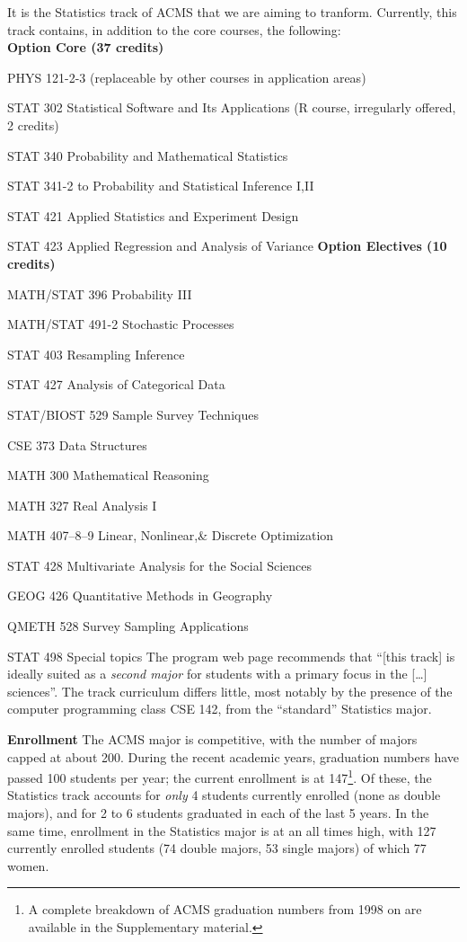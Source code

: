 It is the Statistics track of ACMS that we are aiming to
tranform. Currently, this track contains, in addition to the core
courses, the following:
\\
{\bf Option Core (37 credits)}
\bits
    \item {\sc PHYS 121-2-3} (replaceable by other courses in application areas)
    \item {\sc STAT 302} Statistical Software and Its Applications (R course, irregularly offered, 2 credits)
    \item {\sc STAT 340} Probability and Mathematical Statistics
    \item {\sc STAT 341-2} to Probability and Statistical Inference I,II
    \item {\sc STAT 421} Applied Statistics and Experiment Design
    \item {\sc STAT 423} Applied Regression and Analysis of Variance
\eits
{\bf Option Electives (10 credits)}
\bits
    \item {\sc MATH/STAT 396} Probability III
    \item {\sc MATH/STAT 491-2} Stochastic Processes
    \item {\sc STAT 403}  Resampling Inference
    \item {\sc STAT 427}  Analysis of Categorical Data
    \item {\sc STAT/BIOST 529} Sample Survey Techniques
    \item {\sc CSE 373} Data Structures
    \item {\sc MATH 300} Mathematical Reasoning
    \item {\sc MATH 327}  Real Analysis I
    \item {\sc MATH 407--8--9} Linear, Nonlinear,\& Discrete Optimization
    \item {\sc STAT 428} Multivariate Analysis for the Social Sciences
    \item {\sc GEOG 426} Quantitative Methods in Geography
    \item {\sc QMETH 528} Survey Sampling Applications
    \item {\sc STAT 498} Special topics
\eits
The program web page recommends that ``[this track] is ideally suited as a {\em second major} for students with a primary focus in the [\ldots] sciences''.
The track curriculum differs little, most notably by the
presence of the computer programming class {\sc CSE 142}, from the
``standard'' Statistics major.

{\bf Enrollment} The ACMS major is competitive, with the number of
majors capped at about 200.  During the recent academic years,
graduation numbers have passed 100 students per year; the current
enrollment is at 147\footnote{A complete breakdown of ACMS graduation
  numbers from 1998 on are available in the Supplementary material.}.
Of these, the Statistics track accounts for {\it only} 4 students
currently enrolled (none as double majors), and for 2 to 6 students
graduated in each of the last 5 years. In the same time, enrollment in
the Statistics major is at an all times high, with 127 currently
enrolled students (74 double majors, 53 single majors) of which 77
women.

